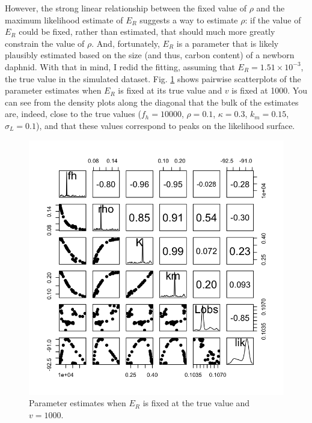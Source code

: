 \documentclass[12pt,reqno,final,pdftex]{amsart}\usepackage[]{graphicx}\usepackage[]{color}
\newenvironment{knitrout}{}{} %
\theoremstyle{plain}
\numberwithin{equation}{part}
\begin{document}
However, the strong linear relationship between the fixed value of $\rho$ and the maximum likelihood estimate of $E_R$ suggests a way to estimate $\rho$:
if the value of $E_R$ could be fixed, rather than estimated, that should much more greatly constrain the value of $\rho$.
And, fortunately, $E_R$ is a parameter that is likely plausibly estimated based on the size (and thus, carbon content) of a newborn daphnid.
With that in mind, I redid the fitting, assuming that $E_R = 1.51\times10^{-3}$, the true value in the simulated dataset.
Fig. \ref{fig:est-rho-fix-ER} shows pairwise scatterplots of the parameter estimates when $E_R$ is fixed at its true value and $v$ is fixed at 1000.
You can see from the density plots along the diagonal that the bulk of the estimates are, indeed, close to the true values ($f_h=10000$, $\rho=0.1$, $\kappa=0.3$, $k_m=0.15$, $\sigma_L=0.1$), and that these values correspond to peaks on the likelihood surface.
\begin{knitrout}\scriptsize
{}\color{fgcolor}\begin{figure}

\includegraphics[width=\linewidth]{figure/est-rho-fix-ER-1} \hfill{}

\caption[Parameter estimates when ]{Parameter estimates when $E_R$ is fixed at the true value and $v=1000$.}\label{fig:est-rho-fix-ER}
\end{figure}


\end{knitrout}
\end{document}
